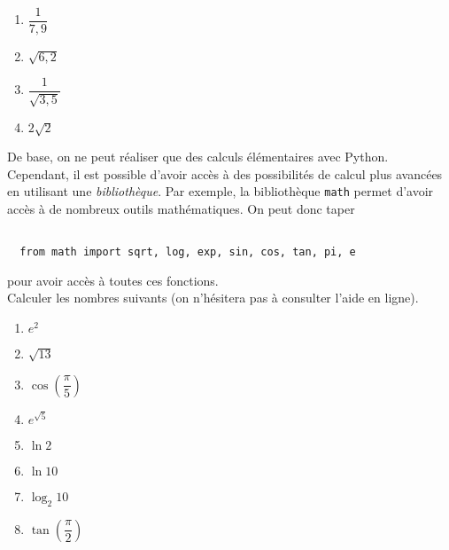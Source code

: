 \begin{multicols}{2}
  \begin{enumerate}[label=\emph{\alph*)}]
    \item $\dfrac{1}{7,9}$
    \item $\sqrt{6,2}$
    \item $\dfrac{1}{\sqrt{3,5}}$
    \item $2\sqrt{2}$
  \end{enumerate}
\end{multicols}
De base, on ne peut réaliser que des calculs élémentaires avec Python. Cependant, il est possible d'avoir accès à des possibilités de calcul plus avancées en utilisant une \emph{bibliothèque}. 
Par exemple, la bibliothèque \texttt{math} permet d'avoir accès à de nombreux outils mathématiques. 
On peut donc taper
\begin{lstlisting}

  from math import sqrt, log, exp, sin, cos, tan, pi, e 
\end{lstlisting}

pour avoir accès à toutes ces fonctions. \\
Calculer les nombres suivants (on n'hésitera pas à consulter l'aide en ligne).
\begin{multicols}{2}
  \begin{enumerate}[label=\emph{\alph*)}]
    \item $e^2$
    \item $\sqrt{13}$
    \item $\cos\left(\dfrac{\pi}{5}\right)$
    \item $e^{\sqrt{5}}$
    \item $\ln 2$
    \item $\ln 10$
    \item $\log_{2} 10$
    \item $\tan\left(\dfrac{\pi}{2}\right)$
  \end{enumerate}
\end{multicols}

